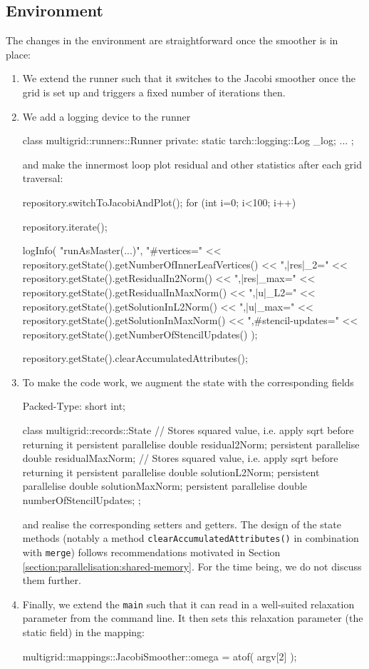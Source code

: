 \subsection{Environment}

The changes in the environment are straightforward once the smoother is 
in place:
\begin{enumerate}
  \item We extend the runner such that it switches to the Jacobi smoother once 
  the grid is set up and triggers a fixed number of iterations then.
  \item We add a logging device to the runner
  \begin{code}
    class multigrid::runners::Runner {
      private:
        static tarch::logging::Log  _log;
        ...
    };
  \end{code}
  and make the innermost loop plot residual and other statistics after each 
  grid traversal:
  \begin{code}
  repository.switchToJacobiAndPlot();
  for (int i=0; i<100; i++) {
    repository.iterate();

    logInfo(
      "runAsMaster(...)",
      "#vertices=" << repository.getState().getNumberOfInnerLeafVertices() <<
      ",|res|_2=" << repository.getState().getResidualIn2Norm() <<
      ",|res|_max=" << repository.getState().getResidualInMaxNorm() <<
      ",|u|_L2=" << repository.getState().getSolutionInL2Norm() <<
      ",|u|_max=" << repository.getState().getSolutionInMaxNorm() <<
      ",#stencil-updates=" << repository.getState().getNumberOfStencilUpdates()
    );

    repository.getState().clearAccumulatedAttributes();
  }
  \end{code}
  \item To make the code work, we augment the state with the corresponding
  fields 
  \begin{code}
Packed-Type: short int;

class multigrid::records::State {  
  // Stores squared value, i.e. apply sqrt before returning it
  persistent parallelise double residual2Norm;
  persistent parallelise double residualMaxNorm;
  // Stores squared value, i.e. apply sqrt before returning it
  persistent parallelise double solutionL2Norm;
  persistent parallelise double solutionMaxNorm;
  persistent parallelise double numberOfStencilUpdates;
};
  \end{code}
  and realise the corresponding setters and getters. The design of the state
  methods (notably a method \texttt{clearAccumulatedAttributes()} in
  combination with \texttt{merge}) follows recommendations motivated in Section
  \ref{section:parallelisation:shared-memory}. For the time being, we do not
  discuss them further.
  \item Finally, we extend the \texttt{main} such that it can read in a
  well-suited relaxation parameter from the command line. It then sets this
  relaxation parameter (the static field) in the mapping:
  \begin{code}
    multigrid::mappings::JacobiSmoother::omega = atof( argv[2] );
  \end{code}
\end{enumerate}


